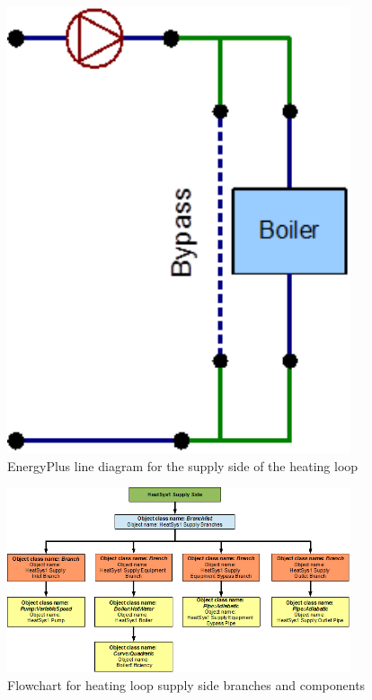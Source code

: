 \begin{figure}[hbtp] %
\centering
\includegraphics[width=0.9\textwidth, height=0.9\textheight, keepaspectratio=true]{media/image077.png}
\caption{EnergyPlus line diagram for the supply side of the heating loop \protect \label{fig:energyplus-line-diagram-for-the-supply-side-004}}
\end{figure}

\begin{figure}[hbtp] %
\centering
\includegraphics[width=0.9\textwidth, height=0.9\textheight, keepaspectratio=true]{media/image078.png}
\caption{Flowchart for heating loop supply side branches and components \protect \label{fig:flowchart-for-heating-loop-supply-side-branches-and}}
\end{figure}

